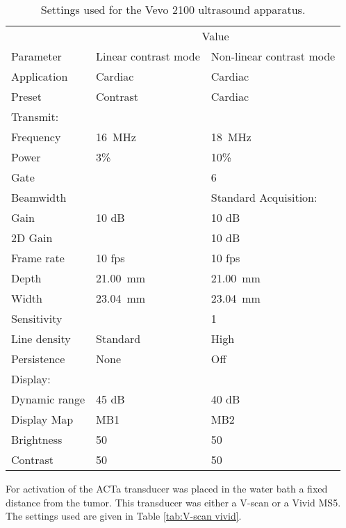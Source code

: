 \begin{table}[htb]
\caption{Settings used for the Vevo 2100 ultrasound apparatus.}
\label{tab:Vevo Ultrasound settings}
\begin{center}
\begin{tabular}{@{}l l l @{}}\toprule
& \multicolumn{2}{c}{Value} \\ \cmidrule(r){2-3}
Parameter & Linear contrast mode & Non-linear contrast mode\\
\midrule
Application & Cardiac & Cardiac\\
Preset & Contrast & Cardiac\\
Transmit:\\
Frequency & \SI{16}{\mega\hertz} & \SI{18}{\mega\hertz}\\
Power & 3\% & 10\%\\
Gate & & 6\\
Beamwidth & & Standard
Acquisition:\\
Gain & 10 dB & 10 dB\\
2D Gain & & 10 dB\\  
Frame rate & 10 fps & 10 fps\\
Depth & \SI{21.00}{\milli\meter} & \SI{21.00}{\milli\meter}\\
Width & \SI{23.04}{\milli\meter} & \SI{23.04}{\milli\meter}\\
Sensitivity & &1\\
Line density & Standard & High \\ 
Persistence & None & Off \\
Display:\\
Dynamic range &45 dB &40 dB \\
Display Map & MB1 & MB2\\
Brightness & 50 & 50\\
Contrast & 50 & 50 \\
  \bottomrule
\end{tabular}
\end{center}
\end{table}

For activation of the ACT\texttrademark a transducer was placed in the water bath a fixed distance from the tumor. This transducer was either a V-scan or a Vivid MS5. The settings used are given in Table \ref{tab:V-scan vivid}.

